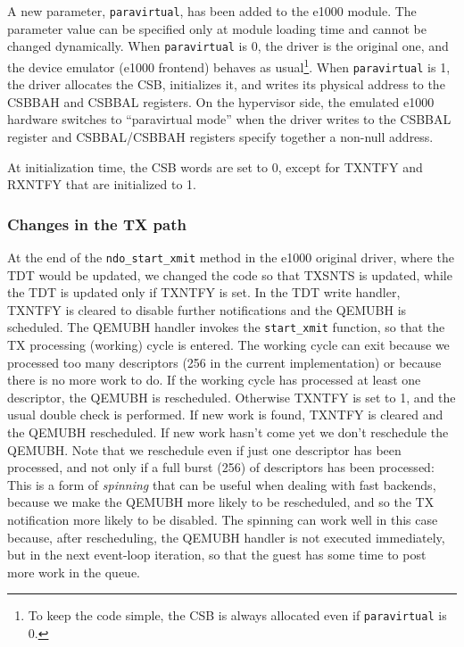 \vspace{0.5cm}

A new parameter, \texttt{paravirtual}, has been added to the e1000 module. The parameter value can be specified only at module loading time
and cannot be changed dynamically. When \texttt{paravirtual} is 0, the driver is the original one, and the device emulator (e1000 frontend)
behaves as usual\footnote{To keep the code simple, the CSB is always allocated even if \texttt{paravirtual} is 0.}. When 
\texttt{paravirtual} is 1, the driver allocates the CSB, initializes it, and writes its physical address to the CSBBAH and CSBBAL registers.
On the hypervisor side, the emulated e1000 hardware switches to ``paravirtual mode'' when the driver writes to the CSBBAL register and
CSBBAL/CSBBAH registers specify together a non-null address.

\vspace{0.5cm}

At initialization time, the CSB words are set to 0, except for TXNTFY and RXNTFY that are initialized to 1.


\subsubsection{Changes in the TX path}
At the end of the \texttt{ndo\_start\_xmit} method in the e1000 original driver, where the TDT would be updated, we changed the
code so that TXSNTS is updated, while the TDT is updated only if TXNTFY is set.
In the TDT write handler, TXNTFY is cleared to disable further notifications and the QEMUBH is scheduled. The QEMUBH handler invokes the
\texttt{start\_xmit} function, so that the TX processing (working) cycle is entered. The working cycle can exit because we processed
too many descriptors (256 in the current implementation) or because there is no more work to do. If the working cycle has processed at least
one descriptor, the QEMUBH is rescheduled. Otherwise TXNTFY is set to 1, and the usual double check is performed. If new work is found,
TXNTFY is cleared and the QEMUBH rescheduled. If new work hasn't come yet we don't reschedule the QEMUBH.
Note that we reschedule even if just one descriptor has been processed, and not only if a full burst (256) of descriptors has been processed:
This is a form of \emph{spinning} that can be useful when dealing with fast backends, because we make the QEMUBH more likely to be
rescheduled, and so the TX notification more likely to be disabled. The spinning can work well in this case because, after rescheduling,
the QEMUBH handler is not executed immediately, but in the next event-loop iteration, so that the guest has some time to post more work 
in the queue.


